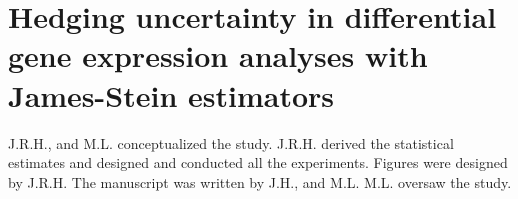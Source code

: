 \chapter{Hedging uncertainty in differential gene expression analyses with James-Stein estimators}

J.R.H., and M.L. conceptualized the study.
J.R.H. derived the statistical estimates and designed and conducted all the experiments.
Figures were designed by J.R.H.
The manuscript was written by J.H., and M.L.
M.L. oversaw the study.







